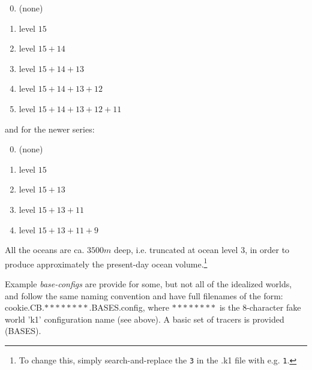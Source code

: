 \vspace{1mm}
\small\begin{enumerate}[noitemsep]
\setlength{\itemindent}{.2in}
\setcounter{enumi}{-1}
\item (none)
\item level \(15\)
\item level \(15 + 14\)
\item level \(15 + 14 + 13\)
\item level \(15 + 14 + 13 + 12\)
\item level \(15 + 14 + 13 + 12 + 11\)
\end{enumerate}\normalsize
\vspace{1mm}
and for the newer series:
\small\begin{enumerate}[noitemsep]
\setlength{\itemindent}{.2in}
\setcounter{enumi}{-1}
\item (none)
\item level \(15\)
\item level \(15 + 13\)
\item level \(15 + 13 + 11\)
\item level \(15 + 13 + 11 + 9\)
\end{enumerate}\normalsize
\vspace{1mm}

All the oceans are ca. \(3500 m\) deep, i.e. truncated at ocean level \(3\), in order to produce approximately the present-day ocean volume.\footnote{To change this, simply search-and-replace the \texttt{3} in the \textsf{\footnotesize .k1} file with e.g. \texttt{1}.}

Example \textit{base-configs} are provide for some, but not all of the idealized worlds, and follow the same naming convention and have full filenames of the form: \textsf{\footnotesize cookie.CB.\(\ast\ast\ast\ast\ast\ast\ast\ast\).BASES.config}, where \(\ast\ast\ast\ast\ast\ast\ast\ast\) is the 8-character fake world 'k1' configuration name (see above). A basic set of tracers is provided (\textsf{\footnotesize BASES}).

